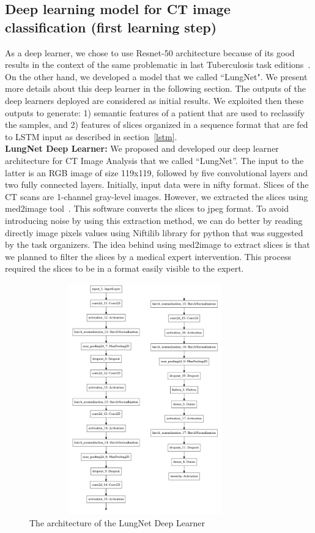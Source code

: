 \documentclass{llncs}
\begin{document}
\subsection{Deep learning model for CT image classification (first learning step)}
As a deep learner, we chose to use Resnet-50 architecture because of its good results in the context of the same problematic in last Tuberculosis task editions~\cite{sgeast17}. On the other hand, we developed a model that we called ``LungNet". We present more details about this deep learner in the following section. The outputs of the deep learners deployed are considered as initial results. We exploited then these outputs to generate: 1) semantic features of a patient that are used to reclassify the samples, and 2) features of slices organized in a sequence format that are fed to LSTM input as described in section~\ref{lstm}.\\

\textbf{LungNet Deep Learner:}
We proposed and developed our deep learner architecture for CT Image Analysis that we called ``LungNet''. The input to the latter is an RGB image of size 119x119, followed by five convolutional layers and two fully connected layers. Initially, input data were in nifty format. Slices of the CT scans are 1-channel gray-level images. However,  we extracted the slices using med2image tool~\cite{med2image}. This software converts the slices to jpeg format. To avoid introducing noise by using this extraction method, we can do better by reading directly image pixels values using Niftilib library for python that was suggested by the task organizers. The idea behind using med2image to extract slices is that we planned to filter the slices by a medical expert intervention. This process required the slices to be in a format easily visible to the expert. 


\begin{figure}
\center
\includegraphics[width=10cm,height=10cm]{lungnet3.pdf}
\caption{The architecture of the LungNet Deep Learner} 
\label{fig:lungnet}
\end{figure}
\end{document}
